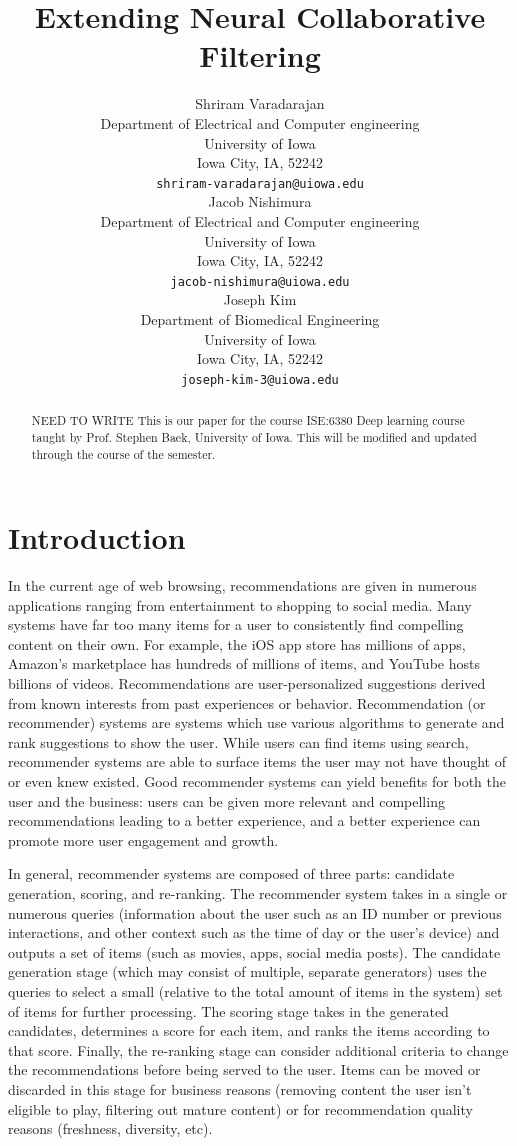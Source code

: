 \documentclass{article}
\title{Extending Neural Collaborative Filtering}
\author{
Shriram Varadarajan \\
Department of Electrical and Computer engineering\\
University of Iowa\\
Iowa City, IA, 52242 \\
\texttt{shriram-varadarajan@uiowa.edu} \\
\And
Jacob Nishimura \\
Department of Electrical and Computer engineering\\
University of Iowa\\
Iowa City, IA, 52242 \\
\texttt{jacob-nishimura@uiowa.edu} \\
\And
Joseph Kim \\
Department of Biomedical Engineering\\
University of Iowa\\
Iowa City, IA, 52242 \\
\texttt{joseph-kim-3@uiowa.edu} \\
}
\begin{document}
\maketitle

\begin{abstract}
NEED TO WRITE This is our paper for the course ISE:6380 Deep learning course taught by Prof. Stephen Baek, University of Iowa. This will be modified and updated through the course of the semester.
\end{abstract}




\section{Introduction}
In the current age of web browsing, recommendations are given in numerous applications ranging from entertainment to shopping to social media. Many systems have far too many items for a user to consistently find compelling content on their own. For example, the iOS app store has millions of apps, Amazon's marketplace has hundreds of millions of items, and YouTube hosts billions of videos. Recommendations are user-personalized suggestions derived from known interests from past experiences or behavior. Recommendation (or recommender) systems are systems which use various algorithms to generate and rank suggestions to show the user. While users can find items using search, recommender systems are able to surface items the user may not have thought of or even knew existed. Good recommender systems can yield benefits for both the user and the business: users can be given more relevant and compelling recommendations leading to a better experience, and a better experience can promote more user engagement and growth.

In general, recommender systems are composed of three parts: candidate generation, scoring, and re-ranking. The recommender system takes in a single or numerous queries (information about the user such as an ID number or previous interactions, and other context such as the time of day or the user's device) and outputs a set of items (such as movies, apps, social media posts). The candidate generation stage (which may consist of multiple, separate generators) uses the queries to select a small (relative to the total amount of items in the system) set of items for further processing. The scoring stage takes in the generated candidates, determines a score for each item, and ranks the items according to that score. Finally, the re-ranking stage can consider additional criteria to change the recommendations before being served to the user. Items can be moved or discarded in this stage for business reasons (removing content the user isn't eligible to play, filtering out mature content) or for recommendation quality reasons (freshness, diversity, etc).
\end{document}
